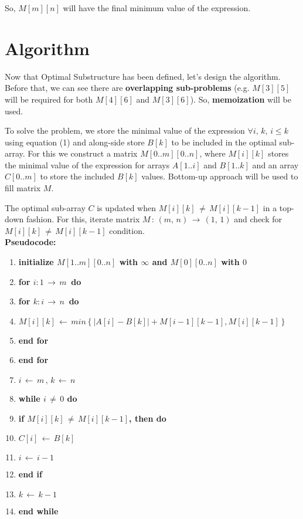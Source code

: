 \documentclass{article}
\begin{document}
    So, $M[m][n]$ will have the final minimum value of the expression.
    
  \section{Algorithm}
    
    Now that Optimal Substructure has been defined, let's design the algorithm. Before 
    that, we can see there are \textbf{overlapping sub-problems} (e.g. $M[3][5]$ will
    be required for both $M[4][6]$ and $M[3][6]$). So, \textbf{memoization} will be used.
    
    To solve the problem, we store the minimal value of the expression $\forall 
    i, \,k,\, i\le k$ using equation (1) and along-side store $B[k]$ to be included in 
    the optimal sub-array. For this we construct a matrix $M[0..m][0..n]$, where 
    $M[i][k]$ stores the minimal value of the expression for arrays $A[1..i]$ and 
    $B[1..k]$ and an array $C[0..m]$ to store the included $B[k]$ values. Bottom-up
    approach will be used to fill matrix $M$.

    The optimal sub-array $C$ is updated when $M[i][k]\,\ne\,M[i][k-1]$ in a top-down
    fashion. For this, iterate matrix $M\,:\,(m,\,n)\,\rightarrow\,(1,\,1)$ 
    and check for $M[i][k]\,\ne\,M[i][k-1]$ condition.\\
    
    \newline\newline \textbf{Pseudocode:}
    
    \begin{enumerate}
        \item \textbf{initialize $M[1..m][0..n]$ with $\infty$ and $M[0][0..n]$ with $0$}
        \item \textbf{for $i : 1\,\rightarrow\,m\,$ do} 
        \quad\quad{}
        \item \quad\textbf{for $k : i\,\rightarrow\,n\,$ do}
        \item \quad\quad\textbf{$M[i][k]\,\leftarrow\,min\left\{\big|A[i]-B[k]\big| + 
        M[i-1][k-1], M[i][k-1]\right\}$}
        \item \quad\textbf{end for}
        \item \textbf{end for}
        \item \textbf{$i\,\leftarrow\,m\,,\,k\,\leftarrow\,n$}
        \item \textbf{while $i\,\ne\,0$ do} 
        \quad\quad{}
        \item \quad\textbf{if $M[i][k]\,\ne\,M[i][k-1]$, then do}
        \item \quad\quad\textbf{$C[i]\,\leftarrow\,B[k]$}
        \item \quad\quad\textbf{$i\,\leftarrow\,i-1$}
        \item \quad\textbf{end if}
        \item \quad\textbf{$k\,\leftarrow\,k-1$}
        \item \textbf{end while}
    \end{enumerate}
    \pagebreak
\end{document}
